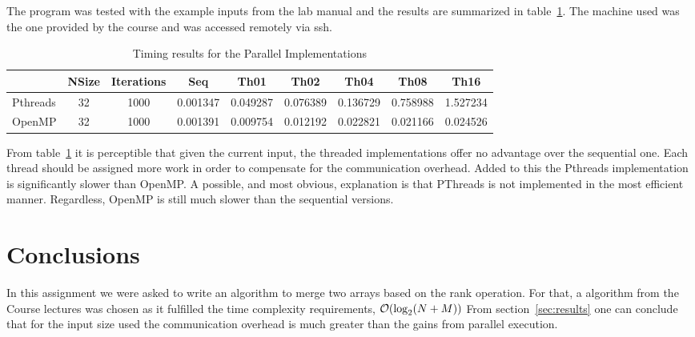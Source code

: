 The program was tested with the example inputs from the lab manual and the results are summarized in table~\ref{tbl:results}. The machine used was the one provided by the course and was accessed remotely via ssh.

\begin{table}[H]
\centering
\begin{tabular}{lcccccccc}
         & NSize & Iterations & Seq      & Th01      & Th02      & Th04      & Th08      & Th16
\\\midrule
Pthreads	&  32 &     1000 & 0.001347 &  0.049287 &  0.076389 &  0.136729 &  0.758988 &  1.527234\\
OpenMP		&  32 &     1000 & 0.001391 &  0.009754 &  0.012192 &  0.022821 &  0.021166 &  0.024526
\end{tabular}
\caption{Timing results for the Parallel Implementations}
\label{tbl:results}
\end{table}

From table~\ref{tbl:results} it is perceptible that given the current input, the threaded implementations offer no advantage over the sequential one. Each thread should be assigned more work in order to compensate for the communication overhead. Added to this the Pthreads implementation is significantly slower than OpenMP. A possible, and most obvious, explanation is that PThreads is not implemented in the most efficient manner. Regardless, OpenMP is still much slower than the sequential versions.

\section{Conclusions}

In this assignment we were asked to write an algorithm to merge two arrays based on the rank operation. For that, a algorithm from the Course lectures was chosen as it fulfilled the time complexity requirements,  $\mathcal{O}(\log_2(N+M))$
From section~\ref{sec:results} one can conclude that for the input size used the communication overhead is much greater than the gains from parallel execution.
